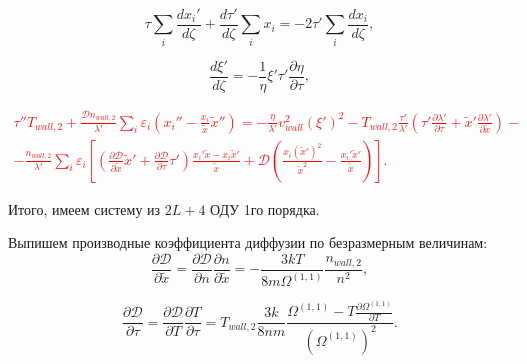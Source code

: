 \documentclass[12pt]{article}
\begin{document}
\begin{equation}
  \tau \sum_{i}\frac{d x_{i}'}{d \zeta} + \frac{d \tau'}{d \zeta}\sum_{i}x_{i} = -2\tau'\sum_{i}\frac{d x_{i}}{d \zeta},\label{eqn-d2x_i-sts-additional}
\end{equation}

\begin{equation}
  \frac{d \xi'}{d\zeta} = -\frac{1}{\eta} \xi' \tau' \frac{\partial \eta}{\partial \tau},\label{eqn-d2xi-sts}
\end{equation}

\textcolor{red}{
\begin{multline}
  \tau''T_{wall,2} + \frac{\mathcal{D}n_{wall,2}}{\lambda'}\sum_{i}\varepsilon_{i}\left(x_{i}'' - \frac{x_{i}}{\tilde{x}}\tilde{x}'' \right) = -\frac{\eta}{\lambda'} v_{wall}^2 \left(\xi' \right)^2 - T_{wall,2}\frac{\tau'}{\lambda'} \left(\tau' \frac{\partial \lambda'}{\partial \tau} + \tilde{x}' \frac{\partial \lambda'}{\partial \tilde{x}} \right) - \\
  - \frac{n_{wall,2}}{\lambda'}\sum_{i}\varepsilon_{i} \left[\left(\frac{\partial \mathcal{D}}{\partial \tilde{x}}\tilde{x}' + \frac{\partial \mathcal{D}}{\partial \tau}\tau' \right) \frac{x_{i}'\tilde{x} - x_{i}\tilde{x}'}{\tilde{x}} + \mathcal{D}\left(\frac{x_{i}\left(\tilde{x}'\right)^2}{\tilde{x}^2} - \frac{x_{i}'\tilde{x}'}{\tilde{x}} \right)  \right].\label{eqn-dtau-sts}
\end{multline}
}

Итого, имеем систему из $2L+4$ ОДУ 1го порядка.

Выпишем производные коэффициента диффузии по безразмерным величинам:
\begin{equation}
  \frac{\partial \mathcal{D}}{\partial \tilde{x}} = \frac{\partial \mathcal{D}}{\partial n}\frac{\partial n}{\partial \tilde{x}} = -\frac{3kT}{8m\Omega^{(1,1)}} \frac{n_{wall,2}}{n^2},
\end{equation}

\begin{equation}
  \frac{\partial \mathcal{D}}{\partial \tau} = \frac{\partial \mathcal{D}}{\partial T}\frac{\partial T}{\partial \tau} = T_{wall,2}\frac{3k}{8nm} \frac{\Omega^{(1,1)} - T \frac{\partial \Omega^{(1,1)}}{\partial T}}{\left(\Omega^{(1,1)}\right)^2}.
\end{equation}
\end{document}
